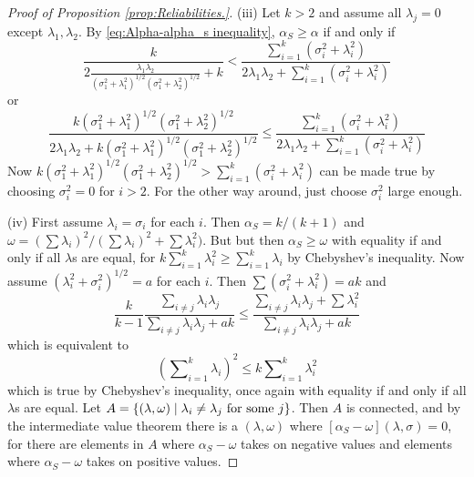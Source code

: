 \documentclass[twoside]{article}
\DeclareMathOperator{\tsum}{\textstyle \sum}
\renewcommand{\sqrt}[1]{{(#1)^{1/2}}}
\begin{document}
\begin{proof}[Proof of Proposition \ref{prop:Reliabilities.}]
(iii) Let $k>2$ and assume all $\lambda_{j}=0$
except $\lambda_{1},\lambda_{2}$. By \eqref{eq:Alpha-alpha_s inequality}, $\alpha_S \geq \alpha$ if and
only if
\[
\frac{k}{2\frac{\lambda_{1}\lambda_{2}}{\sqrt{\sigma_{1}^{2}+\lambda_{1}^{2}}\sqrt{\sigma_{1}^{2}+\lambda_{2}^{2}}}+k}<\frac{\tsum_{i=1}^{k}(\sigma_{i}^{2}+\lambda_{i}^{2})}{2\lambda_{1}\lambda_{2}+\tsum_{i=1}^{k}(\sigma_{i}^{2}+\lambda_{i}^{2})}
\]
or
\begin{equation*}
\frac{k\sqrt{\sigma_{1}^{2}+\lambda_{1}^{2}}\sqrt{\sigma_{1}^{2}+\lambda_{2}^{2}}}{2\lambda_{1}\lambda_{2}+k\sqrt{\sigma_{1}^{2}+\lambda_{1}^{2}}\sqrt{\sigma_{1}^{2}+\lambda_{2}^{2}}} \leq \frac{\tsum_{i=1}^{k}(\sigma_{i}^{2}+\lambda_{i}^{2})}{2\lambda_{1}\lambda_{2}+\tsum_{i=1}^{k}(\sigma_{i}^{2}+\lambda_{i}^{2})}
\end{equation*}
Now $k\sqrt{\sigma_{1}^{2}+\lambda_{1}^{2}}\sqrt{\sigma_{1}^{2}+\lambda_{2}^{2}}>\tsum_{i=1}^{k}(\sigma_{i}^{2}+\lambda_{i}^{2})$
can be made true by choosing $\sigma_{i}^{2}=0$ for $i>2$. For the
other way around, just choose $\sigma_{i}^{2}$ large enough.

(iv) First assume $\lambda_{i}=\sigma_{i}$ for each $i$. Then $\alpha_S=k/(k+1)$
and $\omega=(\tsum\lambda_{i})^{2}/(\tsum\lambda_{i})^{2}+\tsum\lambda_{i}^{2})$.
But but then $\alpha_S\geq\omega$ with equality if and only if
all $\lambda$s are equal, for $k\tsum_{i=1}^{k}\lambda_{i}^{2}\geq\tsum_{i=1}^{k}\lambda_{i}$
by Chebyshev's inequality. Now assume $\sqrt{\lambda_{i}^{2}+\sigma_{i}^{2}}=a$
for each $i$. Then $\tsum(\sigma_{i}^{2}+\lambda_{i}^{2})=ak$
and
\[
\frac{k}{k-1}\frac{\tsum_{i\neq j}\lambda_{i}\lambda_{j}}{\tsum_{i\neq j}\lambda_{i}\lambda_{j}+ak}\leq\frac{\tsum_{i\neq j}\lambda_{i}\lambda_{j}+\tsum\lambda_{i}^{2}}{\tsum_{i\neq j}\lambda_{i}\lambda_{j}+ak}
\]
which is equivalent to
\begin{equation*}
(\tsum_{i=1}^{k}\lambda_{i})^{2} \leq k\tsum_{i=1}^{k}\lambda_{i}^{2}
\end{equation*}
which is true by Chebyshev's inequality, once again with equality
if and only if all $\lambda$s are equal. Let $A=\{ (\lambda,\omega)\mid\lambda_{i}\neq\lambda_{j}\text{\textrm{ for some }}j\} $.
Then $A$ is connected, and by the intermediate value theorem there
is a $(\lambda,\omega)$ where $[\alpha_S-\omega](\lambda,\sigma)=0$,
for there are elements in $A$ where $\alpha_S-\omega$ takes on
negative values and elements where $\alpha_S-\omega$ takes on positive
values.
\end{proof}
\end{document}
